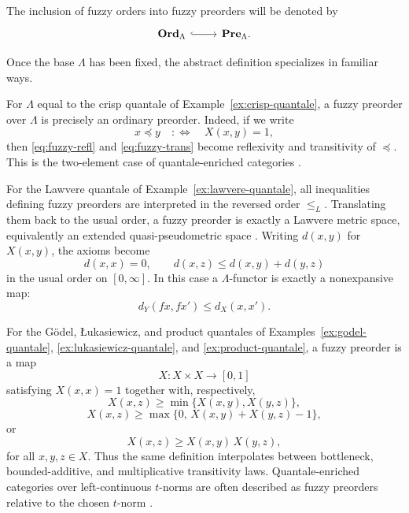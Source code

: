The inclusion of fuzzy orders into fuzzy preorders will be denoted by
\[
    \begin{tikzcd}
        \Ord_\Lambda \arrow[r,hook] & \Pre_\Lambda .
    \end{tikzcd}
\]

Once the base \(\Lambda\) has been fixed, the abstract definition specializes in familiar ways.

\begin{example}\label{ex:ordinary-preorders}
    For \(\Lambda\) equal to the crisp quantale of Example~\ref{ex:crisp-quantale}, a fuzzy preorder over \(\Lambda\) is precisely an ordinary preorder. Indeed, if we write
    \[
        x\preceq y
        \quad:\Longleftrightarrow\quad
        X(x,y)=1,
    \]
    then \eqref{eq:fuzzy-refl} and \eqref{eq:fuzzy-trans} become reflexivity and transitivity of \(\preceq\). This is the two-element case of quantale-enriched categories \cite[Definition~2.2 and the paragraph following it]{stubbe-2014-quantaloid-enriched}.
\end{example}

\begin{example}\label{ex:lawvere-metric-spaces}
    For the Lawvere quantale of Example~\ref{ex:lawvere-quantale}, all inequalities defining fuzzy preorders are interpreted in the reversed order \(\leq_L\). Translating them back to the usual order, a fuzzy preorder is exactly a Lawvere metric space, equivalently an extended quasi-pseudometric space
    \cite{Lawvere1973MetricSpaces} \cite[Example~2.3]{stubbe-2014-quantaloid-enriched}. Writing \(d(x,y)\) for \(X(x,y)\), the axioms become
    \[
        d(x,x)=0,
        \qquad
        d(x,z)\leq d(x,y)+d(y,z)
    \]
    in the usual order on \([0,\infty]\). In this case a \(\Lambda\)-functor is exactly a nonexpansive map:
    \[
        d_Y(fx,fx')\leq d_X(x,x').
    \]
\end{example}

\begin{example}
\label{ex:chain-valued-fuzzy-preorders}
    For the G\"odel, {\L}ukasiewicz, and product quantales of Examples~\ref{ex:godel-quantale}, \ref{ex:lukasiewicz-quantale}, and \ref{ex:product-quantale}, a fuzzy preorder is a map
    \[
        X:X\times X\to [0,1]
    \]
    satisfying \(X(x,x)=1\) together with, respectively,
    \[
        X(x,z)\geq \min\{X(x,y),X(y,z)\},
    \]
    \[
        X(x,z)\geq \max\{0,\,X(x,y)+X(y,z)-1\},
    \]
    or
    \[
        X(x,z)\geq X(x,y)\,X(y,z),
    \]
    for all \(x,y,z\in X\). Thus the same definition interpolates between bottleneck, bounded-additive, and multiplicative transitivity laws. Quantale-enriched categories over left-continuous \(t\)-norms are often described as fuzzy preorders relative to the chosen \(t\)-norm \cite[Example~2.4]{stubbe-2014-quantaloid-enriched}.
\end{example}

